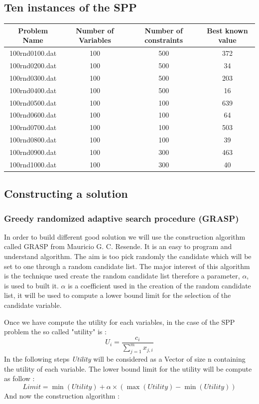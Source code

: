 \documentclass[12pt]{article}
\begin{document}
	\subsection{Ten instances of the SPP}
	\begin{center}
		\begin{tabular}{|c|c|c|c|}
			\hline
			Problem Name & Number of Variables & Number of constraints & Best known value \\
			\hline
			100rnd0100.dat & 100 & 500 & 372\\
			\hline
			100rnd0200.dat & 100 & 500 & 34\\
			\hline
			100rnd0300.dat & 100 & 500 & 203\\
			\hline
			100rnd0400.dat & 100 & 500 & 16\\
			\hline
			100rnd0500.dat & 100 & 100 & 639\\
			\hline
			100rnd0600.dat & 100 & 100 & 64\\
			\hline
			100rnd0700.dat & 100 & 100 & 503\\
			\hline
			100rnd0800.dat & 100 & 100 & 39\\
			\hline
			100rnd0900.dat & 100 & 300 & 463\\
			\hline
			100rnd1000.dat & 100 & 300 & 40\\
			\hline
		\end{tabular}
	\end{center}
	
	\subsection{Constructing a solution}
	 \subsubsection{Greedy randomized adaptive search procedure (GRASP)}
	In order to build different good solution we will use the construction algorithm
	called GRASP from Mauricio G. C. Resende.
	It is an easy to program and understand algorithm. The aim is too pick randomly the
	candidate which will be set to one through a random candidate list. 
	The major interest of this algorithm is the technique used create the random
	candidate list therefore a parameter, $ \alpha$, is used to built it. 
	$ \alpha$ is a coefficient used in the creation of the random candidate list, it
	will be used to compute a lower bound limit for the selection of the candidate
	variable. 
	
	Once we have compute the utility for each variables, in the case of the SPP problem
	the so called "utility" is :
	$$
	U_i =  \frac{c_i}{ \sum\limits_{j=1}^m x_{j,i}} 
	$$
	In the following steps \textit{Utility} will be considered as a Vector of size n
	containing the utility of each variable.
	The lower bound limit for the utility will be compute as follow : \\
	$$
	Limit = \min{(Utility)} + \alpha \times (\max{(Utility)} - \min{(Utility)})
	$$
	And now the construction algorithm :
	
\end{document}
